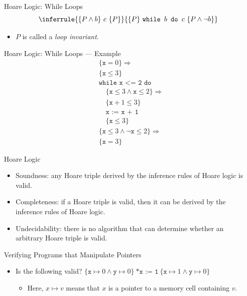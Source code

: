 \documentclass{beamer}
\begin{document}
\begin{frame}{Hoare Logic: While Loops}
  \[
    \inferrule{\{P\land b\}\ c\ \{P\}}
              {\{P\}\ \texttt{while }b\texttt{ do }c\
                 \{P\land\lnot b\}}
  \]
  \begin{itemize}
    \item $P$ is called a \emph{loop invariant}.
  \end{itemize}
\end{frame}

\begin{frame}{Hoare Logic: While Loops --- Example}
  \[
  \begin{aligned}
    &\{\texttt{x}=0\}\Rightarrow \\
    &\{\texttt{x}\leq3\} \\
    &\texttt{while x <= 2 do} \\
    &\quad \{\texttt{x}\leq3\land\texttt{x}\leq2\}\Rightarrow \\
    &\quad \{\texttt{x}+1\leq3\} \\
    &\quad \texttt{x := x + 1} \\
    &\quad \{\texttt{x}\leq3\} \\
    &\{\texttt{x}\leq3\land\lnot\texttt{x}\leq2\}\Rightarrow \\
    &\{\texttt{x}=3\}
  \end{aligned}
  \]
\end{frame}

\begin{frame}{Hoare Logic}
  \begin{itemize}
    \item Soundness: any Hoare triple derived by the inference rules of Hoare logic is valid.
    \item Completeness: if a Hoare triple is valid, then it can be derived by the inference rules of Hoare logic.
    \item Undecidability: there is no algorithm that can determine whether an arbitrary Hoare triple is valid.
  \end{itemize}
\end{frame}

\begin{frame}{Verifying Programs that Manipulate Pointers}
  \begin{itemize}
    \item Is the following valid?
      $\{\texttt{x}\mapsto0\land\texttt{y}\mapsto0\}\
       \texttt{*x := 1}\
       \{\texttt{x}\mapsto1\land\texttt{y}\mapsto0\}$
      \begin{itemize}
        \item Here, $x\mapsto v$ means that $x$ is a pointer to a memory cell containing $v$.
      \end{itemize}
  \end{itemize}
\end{frame}
\end{document}
